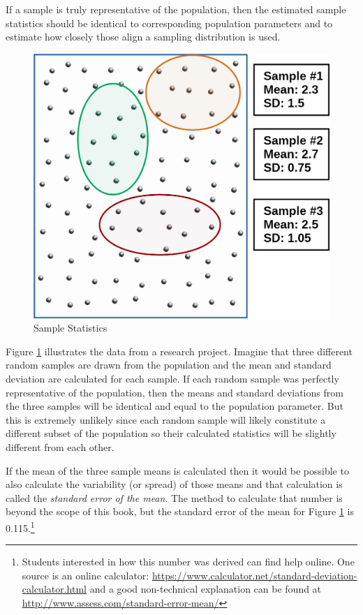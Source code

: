 If a sample is truly representative of the population, then the estimated sample statistics should be identical to corresponding population parameters and to estimate how closely those align a sampling distribution is used. 

\begin{figure}[H]
	\centering
	\includegraphics[]{gfx/07-13}
	\caption{Sample Statistics}
	\label{07:fig13}
\end{figure}

Figure \ref{07:fig13} illustrates the data from a research project. Imagine that three different random samples are drawn from the population and the mean and standard deviation are calculated for each sample. If each random sample was perfectly representative of the population, then the means and standard deviations from the three samples will be identical and equal to the population parameter. But this is extremely unlikely since each random sample will likely constitute a different subset of the population so their calculated statistics will be slightly different from each other. 

If the mean of the three sample means is calculated then it would be possible to also calculate the variability (or spread) of those means and that calculation is called the \textit{standard error of the mean}. The method to calculate that number is beyond the scope of this book, but the standard error of the mean for Figure \ref{07:fig13} is 0.115.\footnote{Students interested in how this number was derived can find help online. One source is an online calculator: \url{https://www.calculator.net/standard-deviation-calculator.html} and a good non-technical explanation can be found at \url{http://www.assess.com/standard-error-mean/}  } 

